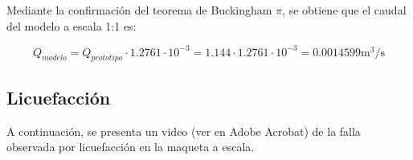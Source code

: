 Mediante la confirmación del teorema de Buckingham $\pi$, se obtiene que el caudal del modelo a escala 1:1 es:

\begin{equation}
    Q_{modelo} = Q_{prototipo} \cdot 1.2761 \cdot 10^{-3} = 1.144 \cdot 1.2761 \cdot 10^{-3} = 0.0014599 \text{m}^3/\text{s}
\end{equation}


\newpage
\subsection{Licuefacción}

A continuación, se presenta un video (ver en Adobe Acrobat) de la falla observada por licuefacción en la maqueta a escala.


